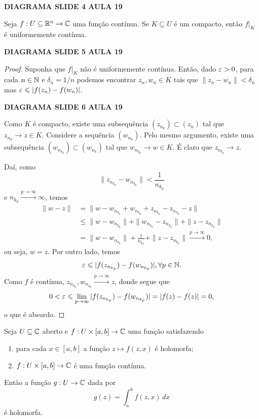 %
\begin{center}
    {\bf DIAGRAMA SLIDE 4 AULA 19}
\end{center}
%
\begin{teorema}
Seja $f:U\subseteq\mathbb{R}^n\to\mathbb{C}$ uma função contínua. Se $K\subseteq U$ é um compacto,
então $f\big|_K$ é uniformemente contínua.
\end{teorema}
%
\begin{center}
    {\bf DIAGRAMA SLIDE 5 AULA 19}
\end{center}
%
\begin{proof}
Suponha que $f\big|_K$ não é uniformemente contínua. Então, dado $\varepsilon>0$, para
cada $n\in\mathbb{N}$ e $\delta_n = 1/n$ podemos encontrar $z_n, w_n\in K$ tais que
$\|z_n - w_n\| < \delta_n$ mas $\varepsilon\leqslant |f(z_n) - f(w_n)|$.
%
\begin{center}
    {\bf DIAGRAMA SLIDE 6 AULA 19}
\end{center}
%
Como $K$ é compacto, existe uma subsequência $(z_{n_k})\subset (z_n)$ tal que
$z_{n_k} \to z\in K$. Considere a sequência $(w_{n_k})$. Pelo mesmo argumento, existe
uma subsequência $(w_{n_{k_p}})\subset (w_{n_k})$ tal que
$w_{n_{k_p}} \to w\in K$. É claro que $z_{n_{k_p}} \to z$.

Daí, como
%
\[
\| z_{n_{k_p}} - w_{n_{k_p}} \| < \frac{1}{n_{k_p}}
\]
%
e $n_{k_p} \xrightarrow{p\to\infty} \infty$, temos
%
\begin{align*}
    \| w - z \| &= \| w - w_{n_{k_p}} + w_{n_{k_p}} + z_{n_{k_p}} - z_{n_{k_p}} - z \| \\
                &\leq \| w - w_{n_{k_p}} \| + \| w_{n_{k_p}} - z_{n_{k_p}} \| + \| z - z_{n_{k_p}} \|\\
                &= \| w - w_{n_{k_p}} \| + \frac{1}{n_{k_p}} + \| z - z_{n_{k_p}} \|
                \xrightarrow{p\to\infty} 0,
\end{align*}
%
ou seja, $w = z$. Por outro lado, temos
%
\[
\varepsilon \leqslant |f(z_{n_{k_p}}) - f(w_{n_{k_p}})|, \forall p\in\mathbb{N}.
\]
%
Como $f$ é contínua, $z_{n_{k_p}}, w_{n_{k_p}} \xrightarrow{p\to\infty} z$, donde segue que
%
\[
0 < \varepsilon \leqslant \lim_{p\to\infty} |f(z_{n_{k_p}}) - f(w_{n_{k_p}})| = |f(z) - f(z)| = 0,
\]
%
o que é absurdo.
\end{proof}
%
\begin{teorema}
Seja $U\subseteq\mathbb{C}$ aberto e $f:U\times[a,b]\to\mathbb{C}$ uma função satisfazendo
%
\begin{enumerate}[1)]
    \item para cada $x\in[a,b]$ a função $z\mapsto f(z,x)$ é holomorfa;
    \item $f:U\times[a,b]\to\mathbb{C}$ é uma função contínua.
\end{enumerate}
%
Então a função $g:U\to\mathbb{C}$ dada por
%
\[
g(z) = \int_a^b f(z,x) \, dx
\]
%
é holomorfa.
\end{teorema}
